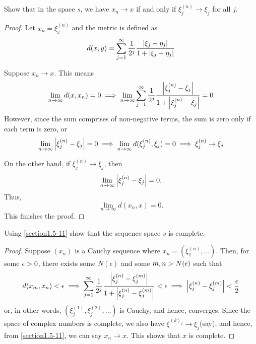 \begin{question}
    Show that in the space $s$, we have $x_n \rightarrow x$ if and only if $\xi_j^{(n)} \rightarrow \xi_j$ for all $j$.
    \label{section1.5-11}
\end{question}
\begin{proof}
    Let $x_n = \xi_j^{(n)}$ and the metric is defined as
    \[d(x,y) = \sum_{j = 1}^\infty \frac{1}{2^j} \frac{\left\lvert \xi_j - \eta_j \right\rvert}{1 + \left\lvert \xi_j - \eta_j \right\rvert}\]

    Suppose $x_n \rightarrow x$. This means
    \[\lim_{n \rightarrow \infty} d(x,x_n) = 0 \implies \lim_{n \rightarrow \infty} \sum_{j = 1}^\infty \frac{1}{2^j} \frac{\left\lvert \xi^{(n)}_j - \xi_j \right\rvert}{1 + \left\lvert \xi^{(n)}_j - \xi_j \right\rvert} = 0\]
    However, since the sum comprises of non-negative terms, the sum is zero only if each term is zero, or
    \[\lim_{n \rightarrow \infty} \left\lvert \xi^{(n)}_j - \xi_j \right\rvert = 0 \implies \lim_{n \rightarrow \infty} d(\xi^{(n)}_j , \xi_j) = 0 \implies \xi^{(n)}_j \rightarrow \xi_j\]

    On the other hand, if $\xi^{(n)}_j \rightarrow \xi_j$, then
    \[\lim_{n \rightarrow \infty}\left\lvert \xi^{(n)}_j - \xi_j \right\rvert = 0.\]
    Thus, 
    \[\lim_{n \rightarrow \infty} d(x_n , x) = 0.\]
    This finishes the proof.
\end{proof}

\begin{question}
    Using \ref{section1.5-11} show that the sequence space $s$ is complete.
    \label{section1.5-12}
\end{question}
\begin{proof}
    Suppose $(x_n)$ is a Cauchy sequence where $x_n = (\xi^{(n)}_1 , \ldots)$. Then, for some $\epsilon > 0$, there exists some $N(\epsilon)$ and some $m , n > N(\epsilon)$ such that
    \[d(x_m , x_n) < \epsilon \implies \sum_{j = 1}^\infty \frac{1}{2^j} \frac{\left\lvert \xi^{(n)}_j - \xi^{(m)}_j \right\rvert}{1 + \left\lvert \xi^{(n)}_j - \xi^{(m)}_j \right\rvert} < \epsilon \implies \left\lvert \xi^{(n)}_j - \xi^{(m)}_j \right\rvert < \frac{\epsilon}{2}\]
    or, in other words, $(\xi^{(1)}_j , \xi^{(2)}_j , \ldots)$ is Cauchy, and hence, converges. Since the space of complex numbers is complete, we also have $\xi^{(k)_j} \rightarrow \xi_j$(say), and hence, from \ref{section1.5-11}, we can say $x_n \rightarrow x$. This shows that $x$ is complete.
    
\end{proof}

